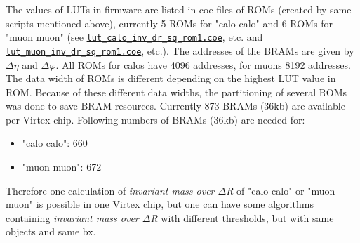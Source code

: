 %
The values of LUTs in firmware are listed in coe files of ROMs (created by same scripts mentioned above), currently 5 ROMs for "calo calo" and 6 ROMs for "muon muon" (see \href{https://github.com/cms-l1-globaltrigger/mp7_ugt_legacy/blob/dev_1_16_x/firmware/ngc/lut_calo_inv_dr_sq_rom1.coe}{\texttt{lut\_calo\_inv\_dr\_sq\_rom1.coe}}, etc. and \href{https://github.com/cms-l1-globaltrigger/mp7_ugt_legacy/blob/dev_1_16_x/firmware/ngc/lut_muon_inv_dr_sq_rom1.coe}{\texttt{lut\_muon\_inv\_dr\_sq\_rom1.coe}}, etc.). The addresses of the BRAMs are given by $\Delta\eta$ and $\Delta\varphi$. All ROMs for calos have 4096 addresses, for muons 8192 addresses. The data width of ROMs is different depending on the highest LUT value in ROM. Because of these different data widths, the partitioning of several ROMs was done to save BRAM resources. Currently 873 BRAMs (36kb) are available per Virtex chip.
Following numbers of BRAMs (36kb) are needed for:
\begin{itemize}
\item "calo calo": 660
\item "muon muon": 672
\end{itemize}
Therefore one calculation of \textit{invariant mass over $\Delta$R} of "calo calo" or "muon muon" is possible in one Virtex chip, but one can have some algorithms containing \textit{invariant mass over $\Delta$R} with different thresholds, but with same objects and same bx.\\


